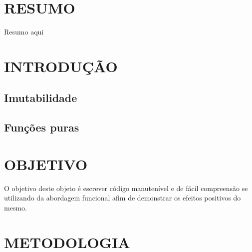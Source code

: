 \documentclass[date,twocolumn,a4paper]{ppgem}
\begin{document}
\thispagestyle{plain}
\makeheader




\section*{RESUMO}
Resumo aqui

\section{INTRODUÇÃO}
\subsection{Imutabilidade}
\subsection{Funções puras}

\section{OBJETIVO}
O objetivo deste objeto é escrever código manutenível e de fácil compreensão se utilizando da abordagem funcional
afim de demonstrar os efeitos positivos do mesmo.

\section{METODOLOGIA}
\end{document}
